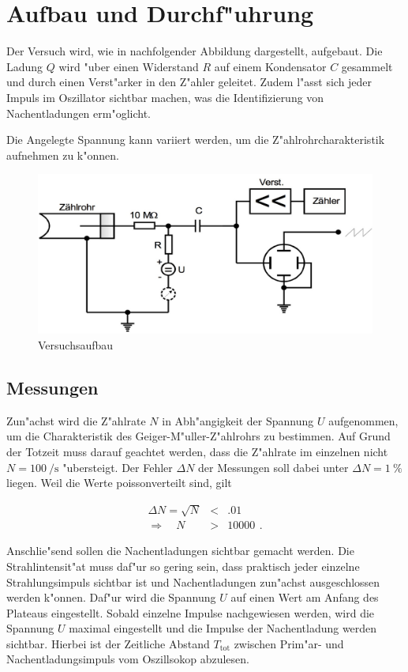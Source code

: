 \section{Aufbau und Durchf"uhrung}
\label{sec:durchfuehrung}
	Der Versuch wird, wie in nachfolgender Abbildung dargestellt, aufgebaut.
	Die Ladung $Q$ wird "uber einen Widerstand $R$ auf einem Kondensator $C$ gesammelt und durch einen Verst"arker in den Z"ahler geleitet.
	Zudem l"asst sich jeder Impuls im Oszillator sichtbar machen, was die Identifizierung von Nachentladungen erm"oglicht.

	Die Angelegte Spannung kann variiert werden, um die Z"ahlrohrcharakteristik aufnehmen zu k"onnen.

	\begin{figure}[h]
		\centering
		\includegraphics[width = 15cm]{img/aufbau.jpeg}
		\caption{Versuchsaufbau}
		\label{fig:aufbau}
	\end{figure}

	\subsection{Messungen}
	\label{subsec:messungen}
		Zun"achst wird die Z"ahlrate $N$ in Abh"angigkeit der Spannung $U$ aufgenommen, um die Charakteristik des Geiger-M"uller-Z"ahlrohrs zu bestimmen.
		Auf Grund der Totzeit muss darauf geachtet werden, dass die Z"ahlrate im einzelnen nicht $N = \SI{100}{\per \second}$ "ubersteigt.
		Der Fehler $\Delta N$ der Messungen soll dabei unter $\Delta N = \SI{1}{\percent}$ liegen.
		Weil die Werte poissonverteilt sind, gilt

		\begin{eqnarray*}
			\Delta N = \sqrt{N} & < & \SI{.01}{} \\
			\Rightarrow \quad N & > & \SI{10000}{} \, .
		\end{eqnarray*}

		Anschlie"send sollen die Nachentladungen sichtbar gemacht werden.
		Die Strahlintensit"at muss daf"ur so gering sein, dass praktisch jeder einzelne Strahlungsimpuls sichtbar ist und Nachentladungen zun"achst ausgeschlossen werden k"onnen.
		Daf"ur wird die Spannung $U$ auf einen Wert am Anfang des Plateaus eingestellt.
		Sobald einzelne Impulse nachgewiesen werden, wird die Spannung $U$ maximal eingestellt und die Impulse der Nachentladung werden sichtbar.
		Hierbei ist der Zeitliche Abstand $T_\mathrm{tot}$ zwischen Prim"ar- und Nachentladungsimpuls vom Oszillsokop abzulesen.


